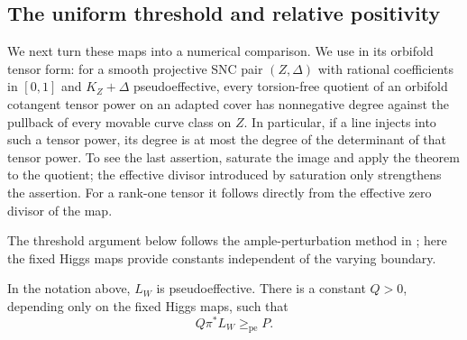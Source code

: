 \subsection{The uniform threshold and relative positivity}

We next turn these maps into a numerical comparison.  We use
\cite[Theorem~1.3]{CP} in its orbifold tensor form: for a smooth
projective SNC pair $(Z,\Delta)$ with rational coefficients in $[0,1]$
and $K_Z+\Delta$ pseudoeffective, every torsion-free quotient of an
orbifold cotangent tensor power on an adapted cover has nonnegative
degree against the pullback of every movable curve class on $Z$.
In particular, if a line injects into such a tensor power, its degree
is at most the degree of the determinant of that tensor power.  To
see the last assertion, saturate the image and apply the theorem to
the quotient; the effective divisor introduced by saturation only
strengthens the assertion.  For a rank-one tensor it follows directly
from the effective zero divisor of the map.

The threshold argument below follows the ample-perturbation method in
\cite[proof of Theorem~7.6]{CP}; here the fixed Higgs maps provide
constants independent of the varying boundary.

\begin{lemma}
\label{lem:pseff-threshold}
In the notation above, $L_W$ is pseudoeffective.  There is a constant
$Q>0$, depending only on the fixed Higgs maps, such that
\begin{equation}\label{eq:nonvanishing-domination}
                         Q\pi^*L_W\ge_{\mathrm{pe}}P.
\end{equation}
\end{lemma}

